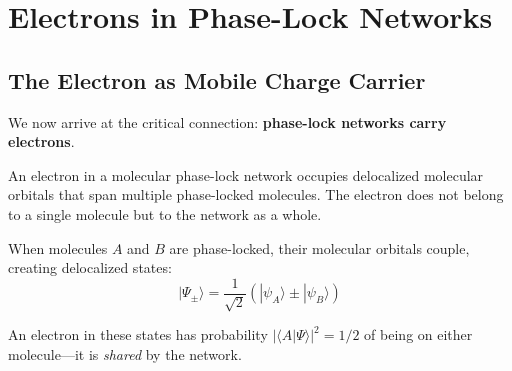 \section{Electrons in Phase-Lock Networks}

\subsection{The Electron as Mobile Charge Carrier}

We now arrive at the critical connection: \textbf{phase-lock networks carry electrons}.

\begin{definition}
\label{def:electron_network}
An electron in a molecular phase-lock network occupies delocalized molecular orbitals that span multiple phase-locked molecules. The electron does not belong to a single molecule but to the network as a whole.
\end{definition}

\begin{theorem}
\label{thm:electron_delocalization}
When molecules $A$ and $B$ are phase-locked, their molecular orbitals couple, creating delocalized states:
\begin{equation}
|\Psi_{\pm}\rangle = \frac{1}{\sqrt{2}} \left(|\psi_A\rangle \pm |\psi_B\rangle\right)
\end{equation}

An electron in these states has probability $|\langle A | \Psi \rangle|^2 = 1/2$ of being on either molecule—it is \textit{shared} by the network.
\end{theorem}

